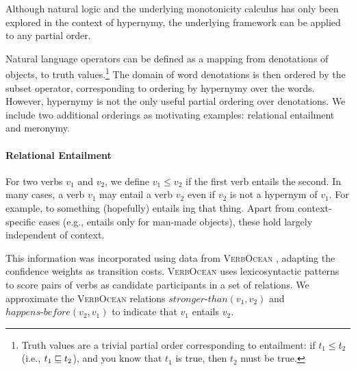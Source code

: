 Although natural logic and the underlying monotonicity calculus has 
  only been explored in the context of hypernymy, the underlying framework
  can be applied to any partial order.%

Natural language operators can be defined as a mapping from
  denotations of objects, to truth values.\footnote{
  Truth values are a trivial partial order corresponding to entailment:
  if \hbox{$t_1 \leq t_2$} 
  (i.e., \hbox{$t_1 \sqsubseteq t_2$}),
  and you know that $t_1$ is true, then $t_2$ must be true.
}
The domain of word denotations is then ordered by the subset operator, corresponding
  to ordering by hypernymy over the words.
However, hypernymy is not the only useful partial ordering over denotations.
We include two additional orderings as motivating examples: relational
  entailment and meronymy.

\paragraph{Relational Entailment}
For two verbs $v_1$ and $v_2$, we define $v_1 \leq v_2$ if the first verb
  entails the second.
In many cases, a verb $v_1$ may entail a verb $v_2$ even if $v_2$ is not a hypernym of $v_1$.
For example, to  something (hopefully) entails ing that thing.
Apart from context-specific cases (e.g.,  entails  only
  for man-made objects), these hold largely independent of context.

This information was incorporated using data from \textsc{VerbOcean}
 \cite{key:2004chklovski-verbocean}, adapting the confidence weights 
 as transition costs.
\textsc{VerbOcean} uses lexicosyntactic patterns to score pairs of 
  verbs as candidate participants in a set of relations.
We approximate the \textsc{VerbOcean} relations $\mathit{stronger\text{-}than}(v_1,v_2)$ and $\mathit{happens\text{-}before}(v_2,v_1)$ to indicate that $v_1$ entails $v_2$.

